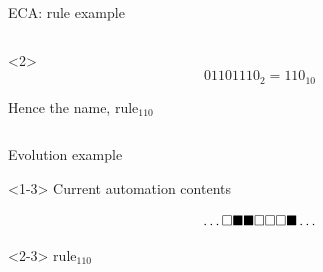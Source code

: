 \documentclass[presentation,aspectratio=169,smaller]{beamer}
\begin{document}
\begin{frame}[label={sec:org8660eb8}]{ECA: rule example}
\begin{columns}
\begin{column}{0.8\columnwidth}
\begin{onlyenv}<2>
\begin{equation*}
  01101110_2 = 110_{10}
\end{equation*}

Hence the name, \(\text{rule}_{110}\)
\end{onlyenv}
\end{column}
\end{columns}
\end{frame}

\begin{frame}[label={sec:org812e2ea},t]{Evolution example}
\begin{onlyenv}<1-3>
Current automation contents

\begin{equation*}
  \hfill
  \dots
  \square
  \blacksquare
  \blacksquare
  \square
  \square
  \square
  \blacksquare
  \dots
  \hfill
\end{equation*}
\end{onlyenv}

\begin{onlyenv}<2-3>
\(\text{rule}_{110}\)


\end{onlyenv}
\end{frame}
\end{document}
